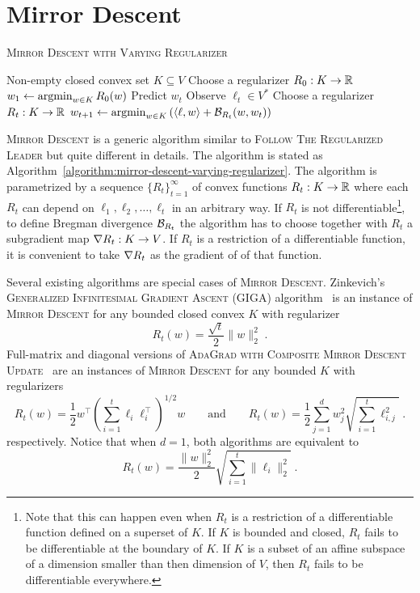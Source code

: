\section{Mirror Descent}
\label{section:mirror-descent}

\begin{algorithm}[t]
\caption{\textsc{Mirror Descent with Varying Regularizer}}
\label{algorithm:mirror-descent-varying-regularizer}
\begin{algorithmic}[1]
\REQUIRE Non-empty closed convex set $K \subseteq V$
\STATE Choose a regularizer $R_0:K \to \mathbb{R}$
\STATE $w_1 \leftarrow \operatorname*{argmin}_{w \in K} R_0(w)$
\STATE Predict $w_t$
\STATE Observe $\ell_t \in V^*$
\STATE Choose a regularizer $R_t:K \to \mathbb{R}$
\STATE $w_{t+1} \leftarrow \operatorname*{argmin}_{w \in K} \left( \langle \ell, w \rangle + \mathcal{B}_{R_t}(w, w_t) \right)$
\ENDFOR
\end{algorithmic}
\end{algorithm}


\textsc{Mirror Descent} is a generic algorithm similar to \textsc{Follow The
Regularized Leader} but quite different in details. The algorithm is stated as
Algorithm~\ref{algorithm:mirror-descent-varying-regularizer}. The algorithm is
parametrized by a sequence $\{R_t\}_{t=1}^\infty$ of convex functions $R_t:K
\to \mathbb{R}$ where each $R_t$ can depend on $\ell_1, \ell_2, \dots, \ell_t$ in an
arbitrary way. If $R_t$ is not differentiable\footnote{Note that this can
happen even when $R_t$ is a restriction of a differentiable function defined on
a superset of $K$.  If $K$ is bounded and closed, $R_t$ fails to be
differentiable at the boundary of $K$. If $K$ is a subset of an affine subspace
of a dimension smaller than then dimension of $V$, then $R_t$ fails to be
differentiable everywhere.}, to define Bregman divergence $\mathcal{B}_{R_t}$ the
algorithm has to choose together with $R_t$ a subgradient map $\nabla R_t:K \to
V$.  If $R_t$ is a restriction of a differentiable function, it is convenient
to take $\nabla R_t$ as the gradient of of that function.

Several existing algorithms are special cases of \textsc{Mirror Descent}.
Zinkevich's \textsc{Generalized Infinitesimal Gradient Ascent} (GIGA)
algorithm~\cite{Zinkevich-2003} is an instance of \textsc{Mirror Descent} for
any bounded closed convex $K$ with regularizer
$$
R_t(w) = \frac{\sqrt{t}}{2}\|w\|_2^2 \; .
$$
Full-matrix and diagonal versions of \textsc{AdaGrad with Composite Mirror
Descent Update}~\cite{Duchi-Hazan-Singer-2011} are an instances of
\textsc{Mirror Descent} for any bounded $K$ with regularizers
$$
R_t(w) = \frac{1}{2} w^\top \left(\sum_{i=1}^t \ell_i \ell_i^\top \right)^{1/2} \!\!\!\! w
\qquad \text{and} \qquad
R_t(w) = \frac{1}{2} \sum_{j=1}^d w_j^2 \sqrt{ \sum_{i=1}^t \ell_{i,j}^2} \; .
$$
respectively. Notice that when $d=1$, both algorithms are equivalent to
$$
R_t(w) = \frac{\|w\|_2^2}{2} \sqrt{\sum_{i=1}^t \|\ell_i\|_2^2 } \; .
$$


